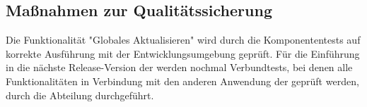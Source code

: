 \subsection{Maßnahmen zur Qualitätssicherung}
\label{sec:Qualitaetssicherung}

Die Funktionalität "Globales Aktualisieren" wird durch die Komponententests auf korrekte Ausführung mit der Entwicklungsumgebung geprüft. Für die Einführung in die nächste Release-Version der \CBPAD werden nochmal Verbundtests, bei denen alle Funktionalitäten in Verbindung mit den anderen Anwendung der \CBP geprüft werden, durch die Abteilung durchgeführt.








